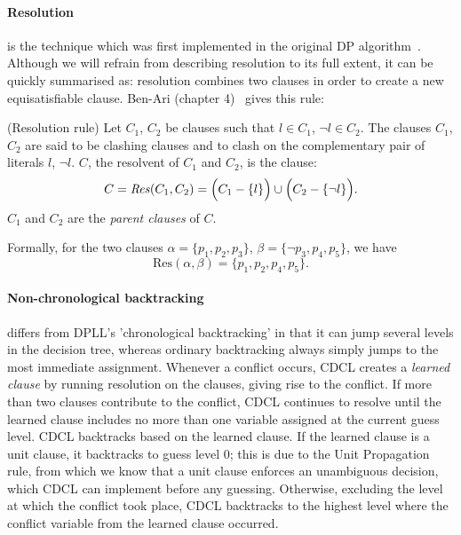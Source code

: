 \paragraph{Resolution} is the technique which was first implemented in the original DP algorithm~\cite{Original-DP-Article}. Although we will refrain from describing resolution to its full extent, it can be quickly summarised as: resolution combines two clauses in order to create a new equisatisfiable clause. Ben-Ari (chapter 4)~\cite{Math-Logic-for-CompSci} gives this rule:
\begin{definition}
    (Resolution rule) Let \(C_1\), \(C_2\) be clauses such that \(l \in C_1\), \(\neg l \in C_2\). The clauses \(C_1\), \(C_2\) are said to be clashing clauses and to clash on the complementary pair of literals \(l\), \(\neg l\). \(C\), the resolvent of \(C_1\) and \(C_2\), is the clause:
    \begin{equation*}
        C = \text{\emph{Res}}(C_1, C_2) = \Big(
            C_1 - \{l\}
        \Big) \cup \Big(
            C_2 - \{\neg l\}
        \Big).
    \end{equation*}
    \(C_1\) and \(C_2\) are the \emph{parent clauses} of \(C\).
\end{definition}
Formally, for the two clauses \(\alpha = \{p_1, p_2, p_3\}\), \(\beta = \{\neg p_3, p_4, p_5\}\), we have
\begin{equation*}
    \text{Res}(\alpha, \beta) = \{p_1, p_2, p_4, p_5\}.
\end{equation*}

\paragraph{Non-chronological backtracking} differs from DPLL's 'chronological backtracking' in that it can jump several levels in the decision tree, whereas ordinary backtracking always simply jumps to the most immediate assignment. Whenever a conflict occurs, CDCL creates a \emph{learned clause} by running resolution on the clauses, giving rise to the conflict. If more than two clauses contribute to the conflict, CDCL continues to resolve until the learned clause includes no more than one variable assigned at the current guess level. CDCL backtracks based on the learned clause. If the learned clause is a unit clause, it backtracks to guess level \(0\); this is due to the Unit Propagation rule, from which we know that a unit clause enforces an unambiguous decision, which CDCL can implement before any guessing. Otherwise, excluding the level at which the conflict took place, CDCL backtracks to the highest level where the conflict variable from the learned clause occurred.

